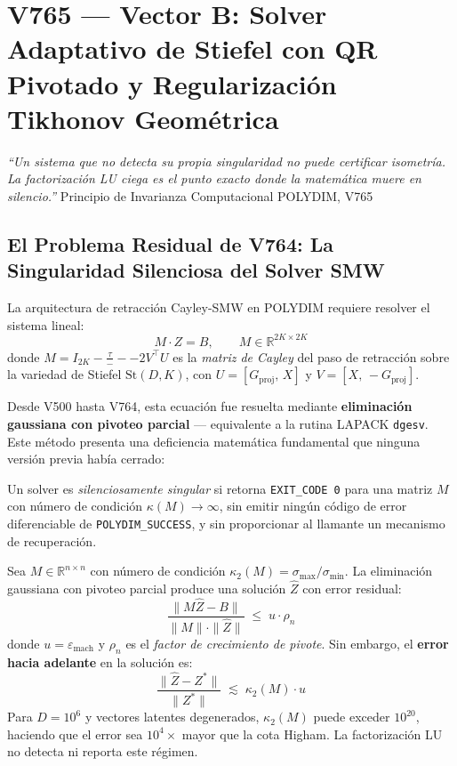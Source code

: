 \chapter{V765 — Vector B: Solver Adaptativo de Stiefel con QR Pivotado y Regularización Tikhonov Geométrica}

\textit{%
  ``Un sistema que no detecta su propia singularidad no puede certificar isometría.
  La factorización LU ciega es el punto exacto donde la matemática muere en silencio.''}%
  {Principio de Invarianza Computacional POLYDIM, V765}

\section{El Problema Residual de V764: La Singularidad Silenciosa del Solver SMW}

La arquitectura de retracción Cayley-SMW en POLYDIM requiere resolver el sistema lineal:
\begin{equation}
  M \cdot Z = B, \qquad M \in \mathbb{R}^{2K \times 2K}
  
\end{equation}
donde $M = I_{2K} - \tfrac{\tau} --- 2 V^\top U$ es la \textit{matriz de Cayley} del paso de
retracción sobre la variedad de Stiefel $\mathrm{St}(D, K)$, con $U = [G_{\mathrm{proj}},\, X]$
y $V = [X,\, -G_{\mathrm{proj}}]$.

Desde V500 hasta V764, esta ecuación fue resuelta mediante \textbf{eliminación gaussiana con
pivoteo parcial} — equivalente a la rutina LAPACK \texttt{dgesv}. Este método presenta una
deficiencia matemática fundamental que ninguna versión previa había cerrado:

\begin{definition}
Un solver es \emph{silenciosamente singular} si retorna \texttt{EXIT\_CODE~0} para una matriz
$M$ con número de condición $\kappa(M) \to \infty$, sin emitir ningún código de error
diferenciable de \texttt{POLYDIM\_SUCCESS}, y sin proporcionar al llamante un mecanismo de
recuperación.
\end{definition}

\begin{theorem}
Sea $M \in \mathbb{R}^{n \times n}$ con número de condición $\kappa_2(M) = \sigma_{\max}/\sigma_{\min}$.
La eliminación gaussiana con pivoteo parcial produce una solución $\hat{Z}$ con error residual:
\begin{equation}
  \frac{\|M\hat{Z} - B\|}{\|M\|\cdot\|\hat{Z}\|} \;\le\; u \cdot \rho_n
\end{equation}
donde $u = \varepsilon_{\text{mach}}$ y $\rho_n$ es el \emph{factor de crecimiento de pivote}.
Sin embargo, el \textbf{error hacia adelante} en la solución es:
\begin{equation}
  \frac{\|\hat{Z} - Z^*\|}{\|Z^*\|} \;\lesssim\; \kappa_2(M) \cdot u
\end{equation}
Para $D = 10^6$ y vectores latentes degenerados, $\kappa_2(M)$ puede exceder $10^{20}$,
haciendo que el error sea $10^4 \times$ mayor que la cota Higham. La factorización LU
no detecta ni reporta este régimen.
\end{theorem}

